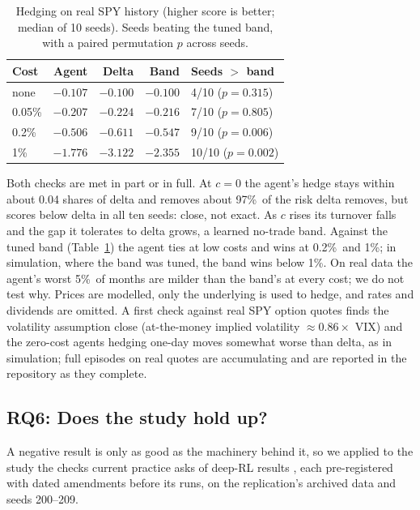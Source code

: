 \documentclass[10pt,twocolumn]{article}
\newcommand{\pc}{\%}  %
\begin{document}
\begin{table}[t]\centering\footnotesize
\caption{Hedging on real SPY history (higher score is better; median of 10 seeds).
Seeds beating the tuned band, with a paired permutation $p$ across seeds.}
\label{tab:hedge}
\begin{tabular}{@{}lrrrl@{}}
\toprule
Cost & Agent & Delta & Band & Seeds $>$ band\\
\midrule
none & $-0.107$ & $-0.100$ & $-0.100$ & 4/10 ($p{=}0.315$)\\
0.05\pc & $-0.207$ & $-0.224$ & $-0.216$ & 7/10 ($p{=}0.805$)\\
0.2\pc & $-0.506$ & $-0.611$ & $-0.547$ & 9/10 ($p{=}0.006$)\\
1\pc & $-1.776$ & $-3.122$ & $-2.355$ & 10/10 ($p{=}0.002$)\\
\bottomrule
\end{tabular}
\end{table}

Both checks are met in part or in full. At $c=0$ the agent's hedge stays within about
0.04 shares of delta and removes about 97\pc\ of the risk delta removes, but scores
below delta in all ten seeds: close, not exact. As $c$ rises its turnover falls and the
gap it tolerates to delta grows, a learned no-trade band. Against the tuned band
(Table~\ref{tab:hedge}) the agent ties at low costs and wins at 0.2\pc\ and 1\pc; in
simulation, where the band was tuned, the band wins below 1\pc. On real data the
agent's worst 5\pc\ of months are milder than the band's at every cost; we do not test
why. Prices are modelled, only the underlying is used to hedge, and rates and
dividends are omitted. A first check against real SPY option quotes finds the
volatility assumption close (at-the-money implied volatility $\approx 0.86\times$
VIX) and the zero-cost agents hedging one-day moves somewhat worse than delta, as in
simulation; full episodes on real quotes are accumulating and are reported in the
repository as they complete.

\subsection{RQ6: Does the study hold up?}\label{sec:rigor}
A negative result is only as good as the machinery behind it, so we applied to the
study the checks current practice asks of deep-RL results
\cite{henderson2018,agarwal2021}, each pre-registered with dated amendments before
its runs, on the replication's archived data and seeds 200--209.
\end{document}
